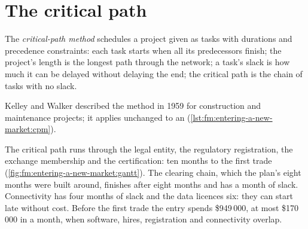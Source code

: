 \section{The critical path}

\begin{definition}\label{def:fm:entering-a-new-market:cpm}
The \emph{critical-path method} schedules a project given as tasks with durations and precedence constraints: each task
starts when all its predecessors finish; the project's length is the longest path through the network; a task's slack is how much it can be delayed
without delaying the end; the critical path is the chain of tasks with no slack.
\end{definition}

Kelley and Walker described the method in 1959 for construction and maintenance projects; it applies unchanged to an 
(\cref{lst:fm:entering-a-new-market:cpm}).

\label{lst:fm:entering-a-new-market:cpm}

The critical path runs through the legal entity, the regulatory registration, the exchange membership and the certification: ten months to the first
trade (\cref{fig:fm:entering-a-new-market:gantt}). The clearing chain, which the plan's eight months were built around, finishes after eight
months and has a month of slack. Connectivity has four months of slack and the data licences six: they can start late without cost. Before the first
trade the entry spends \$949\,000, at most \$170\,000 in a month, when software, hires, registration and connectivity overlap.

